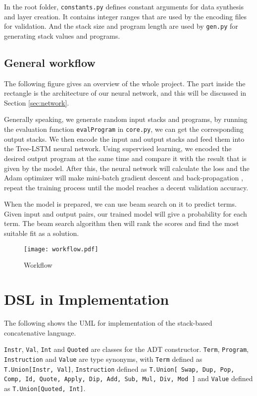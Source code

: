 In the root folder, \texttt{constants.py} defines constant arguments for data synthesis and layer creation. It contains integer ranges that are used by the encoding files for validation. And the stack size and program length are used by \texttt{gen.py} for generating stack values and programs.

\subsection{General workflow}
The following figure gives an overview of the whole project. The part inside the rectangle is the architecture of our neural network, and this will be discussed in Section \ref{sec:network}.

Generally speaking, we generate random input stacks and programs, by running the evaluation function \texttt{evalProgram} in \texttt{core.py}, we can get the corresponding output stacks. We then encode the input and output stacks and feed them into the Tree-LSTM neural network. Using supervised learning, we encoded the desired output program at the same time and compare it with the result that is given by the model. After this, the neural network will calculate the loss and the Adam optimizer \cite{adamW} will make mini-batch gradient descent and back-propagation \cite{BP}, repeat the training process until the model reaches a decent validation accuracy. 

When the model is prepared, we can use beam search on it to predict terms. Given input and output pairs, our trained model will give a probability for each term. The beam search algorithm then will rank the scores and find the most suitable fit as a solution.
\begin{figure}[H]
    \centering
    \texttt{[image: workflow.pdf]}
    \caption{Workflow}
    \label{fig:workflow}
\end{figure} 

\section{DSL in Implementation}
\label{sec:impdsl}
The following shows the UML for implementation of the stack-based concatenative language. 

\texttt{Instr}, \texttt{Val}, \texttt{Int} and \texttt{Quoted} are classes for the ADT constructor. \texttt{Term}, \texttt{Program}, \texttt{Instruction} and \texttt{Value} are type synonyms, with \texttt{Term} defined as \texttt{T.Union[Instr, Val]}, \texttt{Instruction} defined as \texttt{T.Union[
    Swap, Dup, Pop, Comp, Id, Quote, Apply, Dip, Add, Sub, Mul, Div, Mod
]} and \texttt{Value} defined as \texttt{T.Union[Quoted, Int]}.

